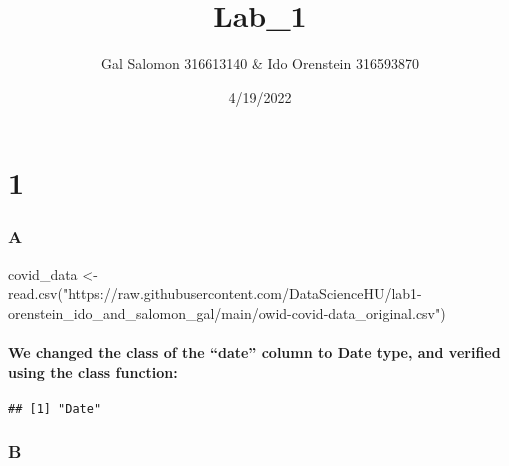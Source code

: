 \documentclass[
]{article}
\title{Lab\_1}
\author{Gal Salomon 316613140 \& Ido Orenstein 316593870}
\date{4/19/2022}
\newenvironment{Shaded}{\begin{snugshade}}{\end{snugshade}}
\newcommand{\FunctionTok}[1]{\textcolor[rgb]{0.00,0.00,0.00}{#1}}
\newcommand{\NormalTok}[1]{#1}
\newcommand{\OtherTok}[1]{\textcolor[rgb]{0.56,0.35,0.01}{#1}}
\newcommand{\SpecialCharTok}[1]{\textcolor[rgb]{0.00,0.00,0.00}{#1}}
\newcommand{\StringTok}[1]{\textcolor[rgb]{0.31,0.60,0.02}{#1}}
\begin{document}
\maketitle

\hypertarget{section}{%
\section{1}\label{section}}

\hypertarget{a}{%
\subsubsection{A}\label{a}}

\begin{Shaded}
\begin{Highlighting}[]
\NormalTok{covid\_data }\OtherTok{\textless{}{-}} \FunctionTok{read.csv}\NormalTok{(}\StringTok{"https://raw.githubusercontent.com/DataScienceHU/lab1{-}orenstein\_ido\_and\_salomon\_gal/main/owid{-}covid{-}data\_original.csv"}\NormalTok{)}
\end{Highlighting}
\end{Shaded}

\hypertarget{we-changed-the-class-of-the-date-column-to-date-type-and-verified-using-the-class-function}{%
\paragraph{We changed the class of the ``date'' column to Date type, and
verified using the class
function:}\label{we-changed-the-class-of-the-date-column-to-date-type-and-verified-using-the-class-function}}

\begin{Shaded}
\end{Shaded}

\begin{verbatim}
## [1] "Date"
\end{verbatim}

\hypertarget{b}{%
\subsubsection{B}\label{b}}
\end{document}
